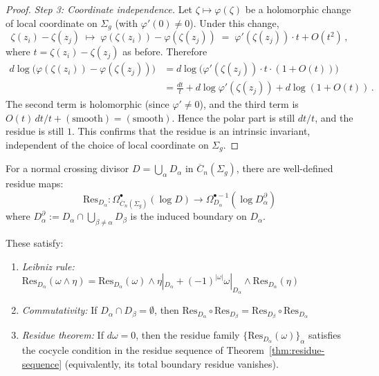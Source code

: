 \begin{proof}
\medskip
\noindent\emph{Step 3: Coordinate independence.}
Let $\zeta \mapsto \varphi(\zeta)$ be a holomorphic change of local coordinate
on $\Sigma_g$ (with $\varphi'(0) \neq 0$).  Under this change,
\[
\zeta(z_i) - \zeta(z_j) \;\longmapsto\;
\varphi(\zeta(z_i)) - \varphi(\zeta(z_j))
\;=\; \varphi'(\zeta(z_j))\cdot t + O(t^2)\,,
\]
where $t = \zeta(z_i) - \zeta(z_j)$ as before.  Therefore
\begin{align*}
d\log\bigl(\varphi(\zeta(z_i)) - \varphi(\zeta(z_j))\bigr)
&= d\log\bigl(\varphi'(\zeta(z_j))\cdot t \cdot (1 + O(t))\bigr) \\
&= \frac{dt}{t} + d\log\varphi'(\zeta(z_j))
+ d\log(1+O(t))\,.
\end{align*}
The second term is holomorphic (since $\varphi' \neq 0$), and the third
term is $O(t)\,dt/t + (\text{smooth}) = (\text{smooth})$.  Hence the polar part
is still $dt/t$, and the residue is still $1$.  This confirms that the
residue is an intrinsic invariant, independent of the choice of local
coordinate on $\Sigma_g$.
\end{proof}

\begin{theorem}\label{thm:residue-operations}
For a normal crossing divisor $D = \bigcup_\alpha D_\alpha$ in $\overline{C}_n(\Sigma_g)$, there are well-defined residue maps:
\[\text{Res}_{D_\alpha}: \Omega^{\bullet}_{\overline{C}_n(\Sigma_g)}(\log D) \to \Omega^{\bullet-1}_{D_\alpha}(\log D_\alpha^\partial)\]
where $D_\alpha^\partial := D_\alpha \cap \bigcup_{\beta\neq\alpha} D_\beta$ is the induced boundary on $D_\alpha$.

These satisfy:
\begin{enumerate}
\item \emph{Leibniz rule:} $\text{Res}_{D_\alpha}(\omega \wedge \eta) = \text{Res}_{D_\alpha}(\omega) \wedge \eta|_{D_\alpha} + (-1)^{|\omega|}\omega|_{D_\alpha} \wedge \text{Res}_{D_\alpha}(\eta)$
\item \emph{Commutativity:} If $D_\alpha \cap D_\beta = \emptyset$, then $\text{Res}_{D_\alpha} \circ \text{Res}_{D_\beta} = \text{Res}_{D_\beta} \circ \text{Res}_{D_\alpha}$
\item \emph{Residue theorem:} If $d\omega=0$, then the residue family $\{\text{Res}_{D_\alpha}(\omega)\}_\alpha$ satisfies the cocycle condition in the residue sequence of Theorem~\ref{thm:residue-sequence} (equivalently, its total boundary residue vanishes).
\end{enumerate}
\end{theorem}

